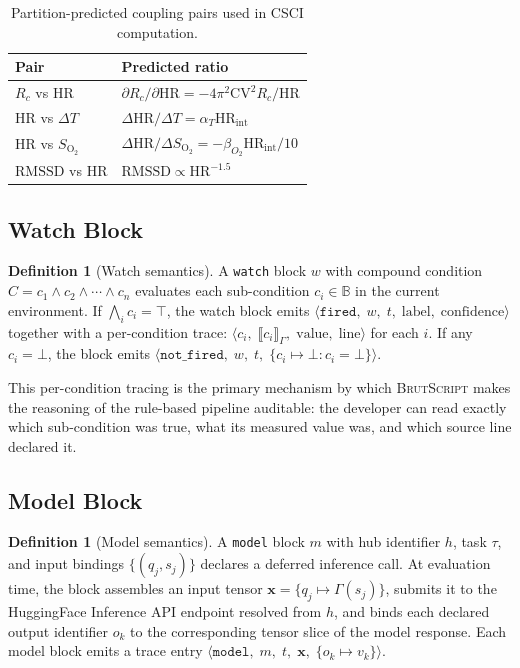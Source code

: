 \documentclass[10pt,twocolumn,a4paper]{article}
\theoremstyle{definition}
\newtheorem{definition}[theorem]{Definition}
\theoremstyle{remark}
\newcommand{\BS}{\textsc{BrutScript}}
\newcommand{\HR}{\mathrm{HR}}
\newcommand{\Rc}{R_c}
\newcommand{\Soxy}{S_{\mathrm{O_2}}}
\begin{document}
\begin{table}[H]
\centering
\caption{Partition-predicted coupling pairs used in CSCI computation.}
\label{tab:coupling}
\footnotesize
\begin{tabularx}{\columnwidth}{lX}
\toprule
\textbf{Pair} & \textbf{Predicted ratio} \\
\midrule
$\Rc$ vs $\HR$ & $\partial\Rc/\partial\HR = -4\pi^2\mathrm{CV}^2\Rc/\HR$ \\
$\HR$ vs $\Delta T$ & $\Delta\HR/\Delta T = \alpha_T \HR_{\mathrm{int}}$ \\
$\HR$ vs $\Soxy$ & $\Delta\HR/\Delta\Soxy = -\beta_{O_2}\HR_{\mathrm{int}}/10$ \\
$\mathrm{RMSSD}$ vs $\HR$ & $\mathrm{RMSSD} \propto \HR^{-1.5}$ \\
\bottomrule
\end{tabularx}
\end{table}

\subsection{Watch Block}

\begin{definition}[Watch semantics]
\label{def:watch}
A \texttt{watch} block $w$ with compound condition
$C = c_1 \wedge c_2 \wedge \cdots \wedge c_n$ evaluates each
sub-condition $c_i \in \mathbb{B}$ in the current environment.
If $\bigwedge_i c_i = \top$, the watch block emits
$\langle\texttt{fired},\;w,\;t,\;\mathrm{label},\;\mathrm{confidence}\rangle$
together with a per-condition trace:
$\langle c_i,\;\llbracket c_i \rrbracket_\Gamma,\;\mathrm{value},\;\mathrm{line}\rangle$
for each $i$.  If any $c_i = \bot$, the block emits
$\langle\texttt{not\_fired},\;w,\;t,\;\{c_i \mapsto \bot : c_i = \bot\}\rangle$.
\end{definition}

This per-condition tracing is the primary mechanism by which \BS{} makes
the reasoning of the rule-based pipeline auditable: the developer can
read exactly which sub-condition was true, what its measured value was,
and which source line declared it.

\subsection{Model Block}

\begin{definition}[Model semantics]
\label{def:model}
A \texttt{model} block $m$ with hub identifier $h$, task $\tau$, and
input bindings $\{(q_j, s_j)\}$ declares a deferred inference call.
At evaluation time, the block assembles an input tensor
$\mathbf{x} = \{q_j \mapsto \Gamma(s_j)\}$, submits it to the
HuggingFace Inference API endpoint resolved from $h$, and binds
each declared output identifier $o_k$ to the corresponding tensor
slice of the model response.  Each model block emits a trace entry
$\langle\texttt{model},\;m,\;t,\;\mathbf{x},\;\{o_k \mapsto v_k\}\rangle$.
\end{definition}
\end{document}
